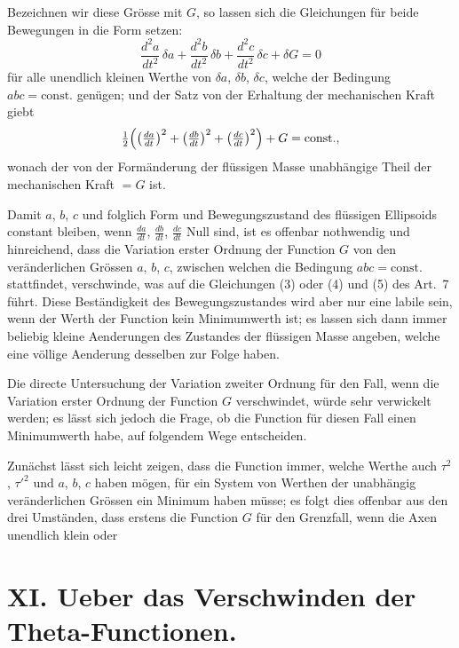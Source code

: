 \documentclass[12pt,a4paper]{article}
\begin{document}
Bezeichnen wir diese Grösse mit $G$, so lassen sich die Gleichungen für beide Bewegungen in die Form setzen:
\begin{equation}
\tag{1} \frac{d^2a}{dt^2}\,\delta a + \frac{d^2b}{dt^2}\,\delta b + \frac{d^2c}{dt^2}\,\delta c + \delta G = 0 \end{equation}
für alle unendlich kleinen Werthe von $\delta a$, $\delta b$, $\delta c$, welche der Bedingung $abc = \text{const.}$ genügen; und der Satz von der Erhaltung der mechanischen Kraft giebt
\[ \tfrac{1}{2}\Bigl(\bigl(\tfrac{da}{dt}\bigr)^2 + \bigl(\tfrac{db}{dt}\bigr)^2 + \bigl(\tfrac{dc}{dt}\bigr)^2\Bigr) + G = \text{const.}, \]
wonach der von der Formänderung der flüssigen Masse unabhängige Theil der mechanischen Kraft $= G$ ist.

Damit $a$, $b$, $c$ und folglich Form und Bewegungszustand des flüssigen Ellipsoids constant bleiben, wenn $\frac{da}{dt}$, $\frac{db}{dt}$, $\frac{dc}{dt}$ Null sind, ist es offenbar nothwendig und hinreichend, dass die Variation erster Ordnung der Function $G$ von den veränderlichen Grössen $a$, $b$, $c$, zwischen welchen die Bedingung $abc = \text{const.}$ stattfindet, verschwinde, was auf die Gleichungen (3) oder (4) und (5) des Art.~7 führt. Diese Beständigkeit des Bewegungszustandes wird aber nur eine labile sein, wenn der Werth der Function kein Minimumwerth ist; es lassen sich dann immer beliebig kleine Aenderungen des Zustandes der flüssigen Masse angeben, welche eine völlige Aenderung desselben zur Folge haben.

Die directe Untersuchung der Variation zweiter Ordnung für den Fall, wenn die Variation erster Ordnung der Function $G$ verschwindet, würde sehr verwickelt werden; es lässt sich jedoch die Frage, ob die Function für diesen Fall einen Minimumwerth habe, auf folgendem Wege entscheiden.

Zunächst lässt sich leicht zeigen, dass die Function immer, welche Werthe auch $\tau^2$, $\tau'^2$ und $a$, $b$, $c$ haben mögen, für ein System von Werthen der unabhängig veränderlichen Grössen ein Minimum haben müsse; es folgt dies offenbar aus den drei Umständen, dass erstens die Function $G$ für den Grenzfall, wenn die Axen unendlich klein oder

\newpage
\section*{XI. Ueber das Verschwinden der Theta-Functionen.}
\end{document}
